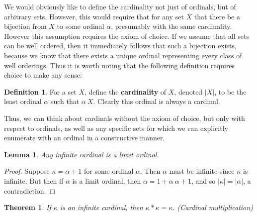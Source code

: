 \documentclass{article}
\theoremstyle{definition}
\newtheorem{definition}{Definition}[section]
\theoremstyle{plain}
\theoremstyle{theorem}
\newtheorem{lemma}{Lemma}[section]
\newtheorem{theorem}{Theorem}[section]
\begin{document}
We would obviously like to define the cardinality not just of ordinals, but of arbitrary sets. However, this would require that for any set $X$ that there be a bijection from $X$ to some ordinal $\alpha$, presumably with the same cardinality. However this assumption requires the axiom of choice. If we assume that all sets can be well ordered, then it immediately follows that such a bijection exists, because we know that there exists a unique ordinal representing every class of well orderings. Thus it is worth noting that the following definition requires choice to make any sense:
\begin{definition}
	For a set $X$, define the \textbf{cardinality} of $X$, denoted $|X|$, to be the least ordinal $\alpha$ such that $\alpha ~ X$. Clearly this ordinal is always a cardinal. 
\end{definition}
Thus, we can think about cardinals without the axiom of choice, but only with respect to ordinals, as well as any specific sets for which we can explicitly enumerate with an ordinal in a constructive manner. 
\begin{lemma}
	Any infinite cardinal is a limit ordinal. 
\end{lemma}
\begin{proof}
	Suppose $\kappa = \alpha+1$ for some ordinal $\alpha$. Then $\alpha$ must be infinite since $\kappa$ is infinite. But then if $\alpha$ is a limit ordinal, then $\alpha = 1+\alpha ~ \alpha+1$, and so $|\kappa| = |\alpha|$, a contradiction.  
\end{proof}
\begin{theorem}
	If $\kappa$ is an infinite cardinal, then $\kappa*\kappa = \kappa$. (Cardinal multiplication)
\end{theorem}
\end{document}
